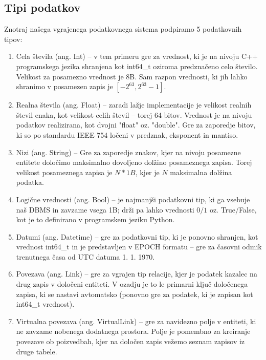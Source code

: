 \documentclass[a4paper,12pt,openright]{book}
\begin{document}
        \subsection{Tipi podatkov}
        Znotraj našega vgrajenega podatkovnega sistema podpiramo 5 podatkovnih tipov:
        \begin{enumerate}
            \item Cela števila (ang. Int) – v tem primeru gre za vrednost, ki je na nivoju C++ programskega jezika shranjena kot int64\_t oziroma predznačeno celo število. Velikost za posamezno vrednost je 8B. Sam razpon vrednosti, ki jih lahko shranimo v posamezen zapis je $[-2^{63}, 2^{63} - 1]$.
            \item Realna števila (ang. Float) – zaradi lažje implementacije je velikost realnih števil enaka, kot velikost celih števil – torej 64 bitov. Vrednost je na nivoju podatkov realizirana, kot dvojni "float" oz. "double". Gre za zaporedje bitov, ki so po standardu IEEE 754 \cite{kahan1996ieee} ločeni v predznak, eksponent in mantiso.
            \item Nizi (ang. String) – Gre za zaporedje znakov, kjer na nivoju posamezne entitete določimo maksimalno dovoljeno dolžino posameznega zapisa. Torej velikost posameznega zapisa je $N * 1B$, kjer je $N$ maksimalna dolžina podatka. 
            \item Logične vrednosti (ang. Bool) – je najmanjši podatkovni tip, ki ga vsebuje naš DBMS in zavzame vsega 1B; drži pa lahko vrednosti $0/1$ oz. True/False, kot je to definirano v programskem jeziku Python.
            \item Datumi (ang. Datetime) – gre za podatkovni tip, ki je ponovno shranjen, kot vrednost int64\_t in je predstavljen v EPOCH formatu \cite{EPOCH_FORMAT} – gre za časovni odmik trenutnega časa od UTC datuma 1. 1. 1970. 
            \item Povezava (ang. Link) – gre za vgrajen tip relacije, kjer je podatek kazalec na drug zapis v določeni entiteti. V ozadju je to le primarni ključ določenega zapisa, ki se nastavi avtomatsko (ponovno gre za podatek, ki je zapisan kot int64\_t vrednost).
            \item Virtualna povezava (ang. VirtualLink) – gre za navidezno polje v entiteti, ki ne zavzame nobenega dodatnega prostora. Polje je pomembno za kreiranje povezave ob poizvedbah, kjer na določen zapis vežemo seznam zapisov iz druge tabele.  
        \end{enumerate}
        
\end{document}
